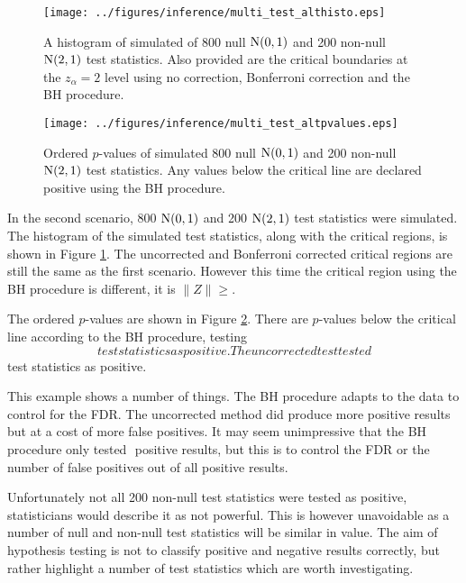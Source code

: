 \begin{figure}
	\centering
	\texttt{[image: ../figures/inference/multi\_test\_althisto.eps]}
	\caption{A histogram of simulated of 800 null $\operatorname{N}(0,1)$ and 200 non-null $\operatorname{N}(2,1)$ test statistics. Also provided are the critical boundaries at the $z_\alpha=2$ level using no correction, Bonferroni correction and the BH procedure.}
	\label{fig:inference_multi_test_althisto}
\end{figure}

\begin{figure}
	\centering
	\texttt{[image: ../figures/inference/multi\_test\_altpvalues.eps]}
    \caption{Ordered $p$-values of simulated 800 null $\operatorname{N}(0,1)$ and 200 non-null $\operatorname{N}(2,1)$ test statistics. Any values below the critical line are declared positive using the BH procedure.}
	\label{fig:inference_multi_test_altpvalues}
\end{figure}

In the second scenario, 800 $\operatorname{N}(0,1)$ and 200 $\operatorname{N}(2,1)$ test statistics were simulated. The histogram of the simulated test statistics, along with the critical regions, is shown in Figure \ref{fig:inference_multi_test_althisto}. The uncorrected and Bonferroni corrected critical regions are still the same as the first scenario. However this time the critical region using the BH procedure is different, it is $\|Z\|\geqslant$.

The ordered $p$-values are shown in Figure \ref{fig:inference_multi_test_altpvalues}. There are $p$-values below the critical line according to the BH procedure, testing $$ test statistics as positive. The uncorrected test tested $$ test statistics as positive.

This example shows a number of things. The BH procedure adapts to the data to control for the FDR. The uncorrected method did produce more positive results but at a cost of more false positives. It may seem unimpressive that the BH procedure only tested $$ positive results, but this is to control the FDR or the number of false positives out of all positive results.

Unfortunately not all 200 non-null test statistics were tested as positive, statisticians would describe it as not powerful. This is however unavoidable as a number of null and non-null test statistics will be similar in value. The aim of hypothesis testing is not to classify positive and negative results correctly, but rather highlight a number of test statistics which are worth investigating.

